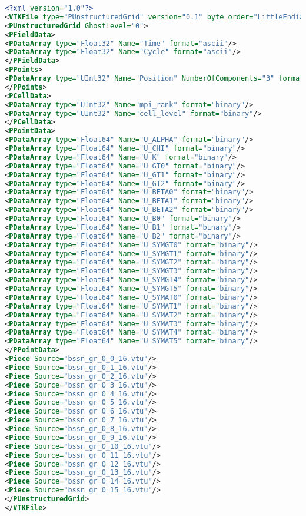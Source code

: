 \documentclass[a4paper,10pt]{article}
\begin{document}
\begin{lstlisting}[language=Xml]
<?xml version="1.0"?>
<VTKFile type="PUnstructuredGrid" version="0.1" byte_order="LittleEndian">
<PUnstructuredGrid GhostLevel="0">
<PFieldData>
<PDataArray type="Float32" Name="Time" format="ascii"/>
<PDataArray type="Float32" Name="Cycle" format="ascii"/>
</PFieldData>
<PPoints>
<PDataArray type="UInt32" Name="Position" NumberOfComponents="3" format="binary"/>
</PPoints>
<PCellData>
<PDataArray type="UInt32" Name="mpi_rank" format="binary"/>
<PDataArray type="UInt32" Name="cell_level" format="binary"/>
</PCellData>
<PPointData>
<PDataArray type="Float64" Name="U_ALPHA" format="binary"/>
<PDataArray type="Float64" Name="U_CHI" format="binary"/>
<PDataArray type="Float64" Name="U_K" format="binary"/>
<PDataArray type="Float64" Name="U_GT0" format="binary"/>
<PDataArray type="Float64" Name="U_GT1" format="binary"/>
<PDataArray type="Float64" Name="U_GT2" format="binary"/>
<PDataArray type="Float64" Name="U_BETA0" format="binary"/>
<PDataArray type="Float64" Name="U_BETA1" format="binary"/>
<PDataArray type="Float64" Name="U_BETA2" format="binary"/>
<PDataArray type="Float64" Name="U_B0" format="binary"/>
<PDataArray type="Float64" Name="U_B1" format="binary"/>
<PDataArray type="Float64" Name="U_B2" format="binary"/>
<PDataArray type="Float64" Name="U_SYMGT0" format="binary"/>
<PDataArray type="Float64" Name="U_SYMGT1" format="binary"/>
<PDataArray type="Float64" Name="U_SYMGT2" format="binary"/>
<PDataArray type="Float64" Name="U_SYMGT3" format="binary"/>
<PDataArray type="Float64" Name="U_SYMGT4" format="binary"/>
<PDataArray type="Float64" Name="U_SYMGT5" format="binary"/>
<PDataArray type="Float64" Name="U_SYMAT0" format="binary"/>
<PDataArray type="Float64" Name="U_SYMAT1" format="binary"/>
<PDataArray type="Float64" Name="U_SYMAT2" format="binary"/>
<PDataArray type="Float64" Name="U_SYMAT3" format="binary"/>
<PDataArray type="Float64" Name="U_SYMAT4" format="binary"/>
<PDataArray type="Float64" Name="U_SYMAT5" format="binary"/>
</PPointData>
<Piece Source="bssn_gr_0_0_16.vtu"/>
<Piece Source="bssn_gr_0_1_16.vtu"/>
<Piece Source="bssn_gr_0_2_16.vtu"/>
<Piece Source="bssn_gr_0_3_16.vtu"/>
<Piece Source="bssn_gr_0_4_16.vtu"/>
<Piece Source="bssn_gr_0_5_16.vtu"/>
<Piece Source="bssn_gr_0_6_16.vtu"/>
<Piece Source="bssn_gr_0_7_16.vtu"/>
<Piece Source="bssn_gr_0_8_16.vtu"/>
<Piece Source="bssn_gr_0_9_16.vtu"/>
<Piece Source="bssn_gr_0_10_16.vtu"/>
<Piece Source="bssn_gr_0_11_16.vtu"/>
<Piece Source="bssn_gr_0_12_16.vtu"/>
<Piece Source="bssn_gr_0_13_16.vtu"/>
<Piece Source="bssn_gr_0_14_16.vtu"/>
<Piece Source="bssn_gr_0_15_16.vtu"/>
</PUnstructuredGrid>
</VTKFile> 
\end{lstlisting}
\end{document}
